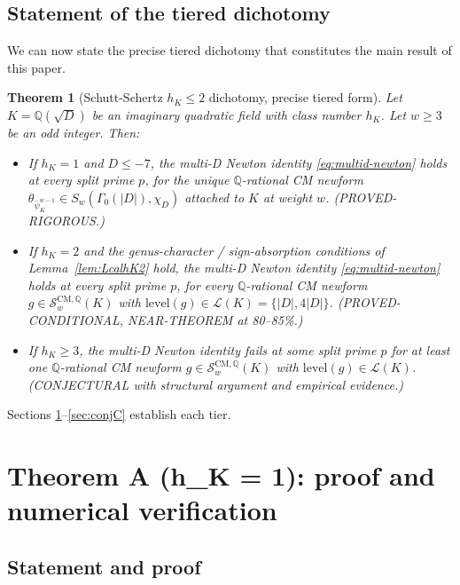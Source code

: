 \documentclass[11pt,a4paper]{amsart}
\newtheorem{theorem}{Theorem}[section]
\theoremstyle{definition}
\newcommand{\Q}{\mathbb{Q}}
\newcommand{\Lcal}{\mathcal{L}}
\newcommand{\Scal}{\mathcal{S}}
\newcommand{\hK}{h_{K}}
\begin{document}
\subsection{Statement of the tiered dichotomy}\label{sec:dichotomy}

We can now state the precise tiered dichotomy that constitutes the main result of this paper.

\begin{theorem}[Schutt-Schertz $h_K \le 2$ dichotomy, precise tiered form]\label{thm:dichotomy-precise}
Let $K = \Q(\sqrt{D})$ be an imaginary quadratic field with class number $\hK$. Let $w \ge 3$ be an odd integer. Then:

\begin{itemize}[leftmargin=2em]
  \item[\textbf{(A)}] If $\hK = 1$ and $D \le -7$, the multi-D Newton identity \eqref{eq:multid-newton} holds at every split prime $p$, for the unique $\Q$-rational CM newform $\theta_{\bar\psi_K^{w-1}} \in S_w(\Gamma_0(|D|), \chi_D)$ attached to $K$ at weight $w$. (\emph{PROVED-RIGOROUS}.)
  \item[\textbf{(B)}] If $\hK = 2$ and the genus-character / sign-absorption conditions of Lemma~\ref{lem:LcalhK2} hold, the multi-D Newton identity \eqref{eq:multid-newton} holds at every split prime $p$, for every $\Q$-rational CM newform $g \in \Scal_w^{\mathrm{CM},\Q}(K)$ with $\mathrm{level}(g) \in \Lcal(K) = \{|D|, 4|D|\}$. (\emph{PROVED-CONDITIONAL}, NEAR-THEOREM at 80--85\%.)
  \item[\textbf{(C)}] If $\hK \ge 3$, the multi-D Newton identity fails at some split prime $p$ for at least one $\Q$-rational CM newform $g \in \Scal_w^{\mathrm{CM},\Q}(K)$ with $\mathrm{level}(g) \in \Lcal(K)$. (\emph{CONJECTURAL with structural argument and empirical evidence}.)
\end{itemize}
\end{theorem}

Sections \ref{sec:theoremA}--\ref{sec:conjC} establish each tier.


\section{Theorem A (h\_K = 1): proof and numerical verification}\label{sec:theoremA}

\subsection{Statement and proof}\label{sec:thmA-proof}
\end{document}
